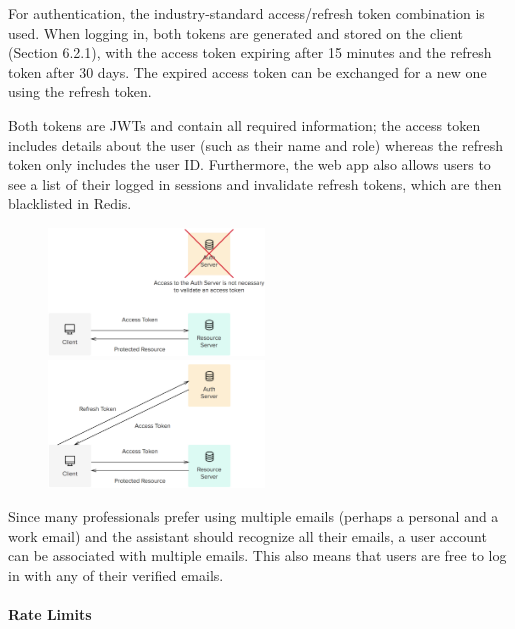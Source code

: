 \documentclass{article}
\begin{document}
For authentication, the industry-standard access/refresh token combination is used. When logging in, both tokens are generated and stored on the client (Section 6.2.1), with the access token expiring after 15 minutes and the refresh token after 30 days. The expired access token can be exchanged for a new one using the refresh token.

Both tokens are JWTs and contain all required information; the access token includes details about the user (such as their name and role) whereas the refresh token only includes the user ID. Furthermore, the web app also allows users to see a list of their logged in sessions and invalidate refresh tokens, which are then blacklisted in Redis.

\begin{figure}[h]
	\centering
	\begin{minipage}{.47\textwidth}
		\centering
		\includegraphics[width=5.75cm]{access-token.png}
	\end{minipage}%
	\hspace{.5cm}
	\begin{minipage}{.47\textwidth}
		\centering
		\includegraphics[width=5.75cm]{refresh-token.png}
	\end{minipage}
\end{figure}

Since many professionals prefer using multiple emails (perhaps a personal and a work email) and the assistant should recognize all their emails, a user account can be associated with multiple emails. This also means that users are free to log in with any of their verified emails.

\paragraph{Rate Limits}
\end{document}
